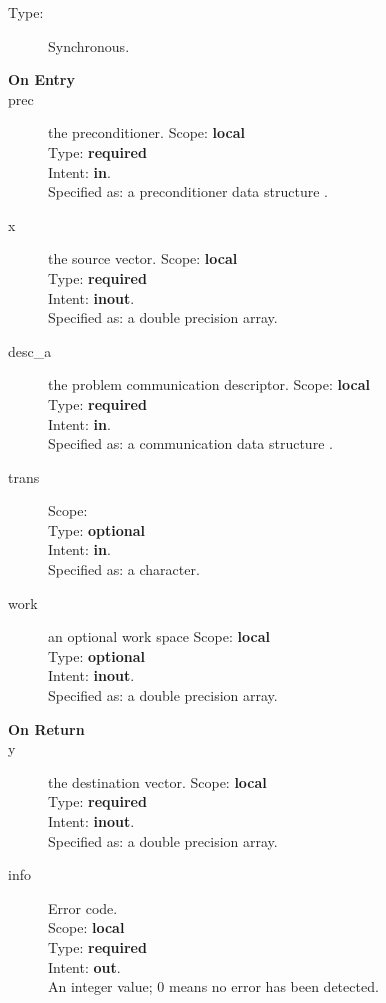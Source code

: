 

\begin{description}
\item[Type:] Synchronous.
\item[\bf On Entry]
\item[prec] the preconditioner.
Scope: {\bf local} \\
Type: {\bf required}\\
Intent: {\bf in}.\\
Specified as: a preconditioner data structure \precdata.
\item[x] the source vector.
Scope: {\bf local} \\
Type: {\bf required}\\
Intent: {\bf inout}.\\
Specified as: a double precision array.
\item[desc\_a] the problem communication descriptor.
Scope: {\bf local} \\
Type: {\bf required}\\
Intent: {\bf in}.\\
Specified as: a communication data structure \descdata.
\item[trans] 
Scope: {\bf } \\
Type: {\bf optional}\\
Intent: {\bf in}.\\
Specified as: a character.
\item[work] an optional work space
Scope: {\bf local} \\
Type: {\bf optional}\\
Intent: {\bf inout}.\\
Specified as: a double precision array.
\end{description}

\begin{description}
\item[\bf On Return]
\item[y] the destination vector.
Scope: {\bf local} \\
Type: {\bf required}\\
Intent: {\bf inout}.\\
Specified as: a double precision array.
\item[info] Error code.\\
Scope: {\bf local} \\
Type: {\bf required} \\
Intent: {\bf out}.\\
An integer value; 0 means no error has been detected. 
\end{description}



